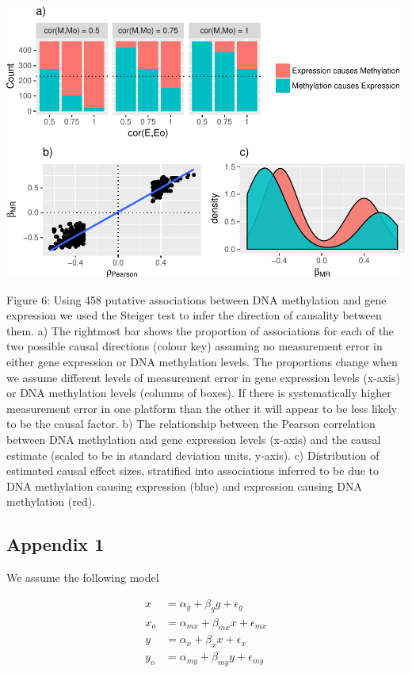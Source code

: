 \documentclass[]{article}
\begin{document}
\includegraphics{manuscript_files/figure-latex/shakhplot-1.pdf}

Figure 6: Using 458 putative associations between DNA methylation and
gene expression we used the Steiger test to infer the direction of
causality between them. a) The rightmost bar shows the proportion of
associations for each of the two possible causal directions (colour key)
assuming no measurement error in either gene expression or DNA
methylation levels. The proportions change when we assume different
levels of measurement error in gene expression levels (x-axis) or DNA
methylation levels (columns of boxes). If there is systematically higher
measurement error in one platform than the other it will appear to be
less likely to be the causal factor. b) The relationship between the
Pearson correlation between DNA methylation and gene expression levels
(x-axis) and the causal estimate (scaled to be in standard deviation
units, y-axis). c) Distribution of estimated causal effect sizes,
stratified into associations inferred to be due to DNA methylation
causing expression (blue) and expression causing DNA methylation (red).

\newpage

\subsection{Appendix 1}\label{appendix-1}

We assume the following model

\[
\begin{aligned}
x   & = \alpha_g + \beta_g g + \epsilon_g \\
x_o & = \alpha_{mx} + \beta_{mx} x + \epsilon_{mx} \\
y   & = \alpha_x + \beta_x x + \epsilon_x \\
y_o & = \alpha_{my} + \beta_{my} y + \epsilon_{my}
\end{aligned}
\]
\end{document}
